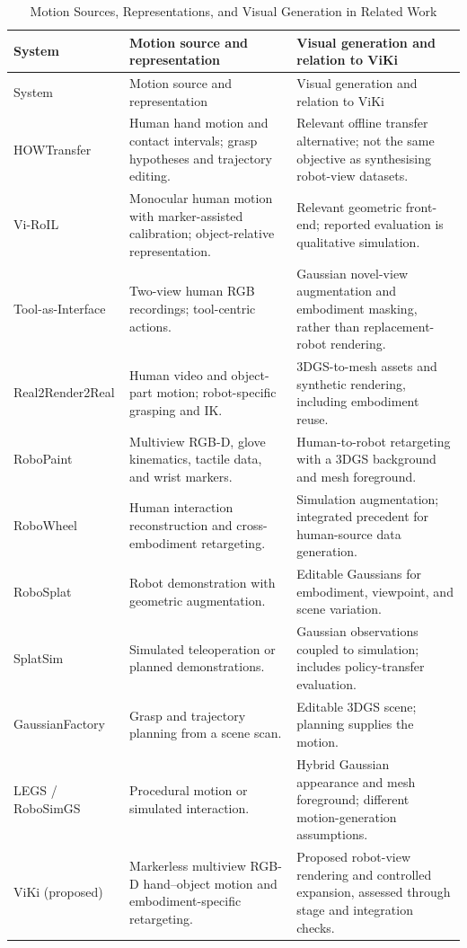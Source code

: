 \begingroup
\small
{}
\setlength{\tabcolsep}{4pt}
\begin{longtable}{@{}>{\raggedright\arraybackslash}p{3.2cm}>{\raggedright\arraybackslash}p{4.9cm}>{\raggedright\arraybackslash}p{6.7cm}@{}}
\caption{Motion Sources, Representations, and Visual Generation in Related Work}
\label{tab:positioning}\\
\toprule
System & Motion source and representation & Visual generation and relation to ViKi \\
\midrule
\endfirsthead
\toprule
System & Motion source and representation & Visual generation and relation to ViKi \\
\midrule
\endhead
\bottomrule
\endfoot
HOWTransfer \cite{howtransfer} & Human hand motion and contact intervals; grasp hypotheses and trajectory editing. & Relevant offline transfer alternative; not the same objective as synthesising robot-view datasets. \\[3pt]
Vi-RoIL \cite{viroil} & Monocular human motion with marker-assisted calibration; object-relative representation. & Relevant geometric front-end; reported evaluation is qualitative simulation. \\[3pt]
Tool-as-Interface \cite{toolif} & Two-view human RGB recordings; tool-centric actions. & Gaussian novel-view augmentation and embodiment masking, rather than replacement-robot rendering. \\[3pt]
Real2Render2Real \cite{real2render2real} & Human video and object-part motion; robot-specific grasping and IK. & 3DGS-to-mesh assets and synthetic rendering, including embodiment reuse. \\[3pt]
RoboPaint \cite{robopaint} & Multiview RGB-D, glove kinematics, tactile data, and wrist markers. & Human-to-robot retargeting with a 3DGS background and mesh foreground. \\[3pt]
RoboWheel \cite{robowheel} & Human interaction reconstruction and cross-embodiment retargeting. & Simulation augmentation; integrated precedent for human-source data generation. \\[3pt]
RoboSplat \cite{robosplat} & Robot demonstration with geometric augmentation. & Editable Gaussians for embodiment, viewpoint, and scene variation. \\[3pt]
SplatSim \cite{splatsim} & Simulated teleoperation or planned demonstrations. & Gaussian observations coupled to simulation; includes policy-transfer evaluation. \\[3pt]
GaussianFactory \cite{gaussianfactory} & Grasp and trajectory planning from a scene scan. & Editable 3DGS scene; planning supplies the motion. \\[3pt]
LEGS / RoboSimGS \cite{legs, robosimgs} & Procedural motion or simulated interaction. & Hybrid Gaussian appearance and mesh foreground; different motion-generation assumptions. \\[3pt]
ViKi (proposed) & Markerless multiview RGB-D hand--object motion and embodiment-specific retargeting. & Proposed robot-view rendering and controlled expansion, assessed through stage and integration checks. \\
\end{longtable}
\endgroup

